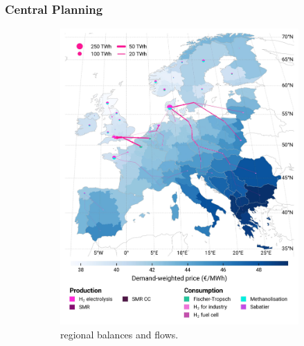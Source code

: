 \documentclass[preprint,12pt,sort&compress]{elsarticle}
\begin{document}
\subsubsection{Central Planning}
\begin{figure}[htbp]
  \centering
  \begin{subfigure}[t]{0.49\textwidth}
      \vspace{0pt}
      \includegraphics[width=1\textwidth]{maps/greenfield-pipelines/base_s_adm___2030-balance_map_H2}
      \vspace{-0.5cm}
      \caption{ regional balances and flows.}
      \label{fig:CP_lt_2030_h2}
  \end{subfigure}
  \hfill
  \begin{subfigure}[t]{0.49\textwidth}
      \vspace{0pt}

\end{subfigure}
\end{figure}
\end{document}
